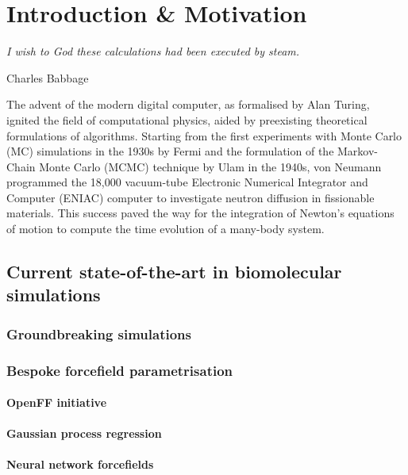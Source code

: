 \chapter{Introduction \& Motivation}
\label{chapter:introduction}
%
\epigraph{\textit{I wish to God these calculations had been executed by steam.}}{Charles Babbage}
The advent of the modern digital computer, as formalised by Alan Turing,\cite{Turing1937} ignited the field of computational physics, aided by preexisting theoretical formulations of algorithms. Starting from the first experiments with Monte Carlo (MC) simulations in the 1930s by Fermi and the formulation of the Markov-Chain Monte Carlo (MCMC) technique by Ulam in the 1940s, von Neumann programmed the 18,000 vacuum-tube Electronic Numerical Integrator and Computer (ENIAC) computer to investigate neutron diffusion in fissionable materials.\cite{metropolis1987beginning} This success paved the way for the integration of Newton's equations of motion to compute the time evolution of a many-body system.\\

\section{Current state-of-the-art in biomolecular simulations}
\label{sec:sota_bio_sims}
\subsection{Groundbreaking simulations}

\subsection{Bespoke forcefield parametrisation}
\label{sec:ff_devel}

\subsubsection{OpenFF initiative}

\subsubsection{Gaussian process regression}

\subsubsection{Neural network forcefields}

